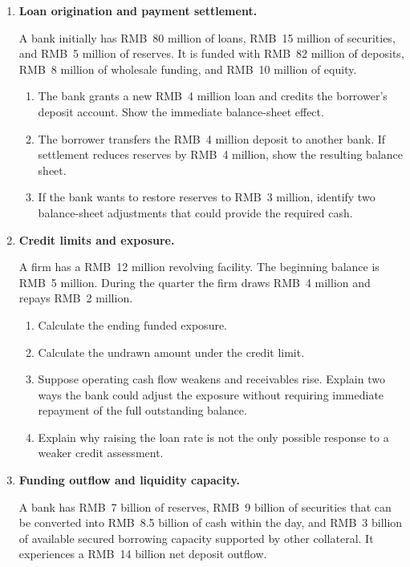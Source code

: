 \begin{enumerate}

\item \textbf{Loan origination and payment settlement.}

A bank initially has RMB~80 million of loans, RMB~15 million of securities, and RMB~5 million of reserves. It is funded with RMB~82 million of deposits, RMB~8 million of wholesale funding, and RMB~10 million of equity.

\begin{enumerate}

\item The bank grants a new RMB~4 million loan and credits the borrower's
deposit account. Show the immediate balance-sheet effect.

\item The borrower transfers the RMB~4 million deposit to another bank.
If settlement reduces reserves by RMB~4 million, show the resulting balance sheet.

\item If the bank wants to restore reserves to RMB~3 million, identify two
balance-sheet adjustments that could provide the required cash.

\end{enumerate}

\item \textbf{Credit limits and exposure.}

A firm has a RMB~12 million revolving facility. The beginning balance is RMB~5 million. During the quarter the firm draws RMB~4 million and repays RMB~2 million.

\begin{enumerate}
\item Calculate the ending funded exposure.
\item Calculate the undrawn amount under the credit limit.
\item Suppose operating cash flow weakens and receivables rise. Explain two ways the bank could adjust the exposure without requiring immediate repayment of the full outstanding balance.
\item Explain why raising the loan rate is not the only possible response to a weaker credit assessment.
\end{enumerate}

\item \textbf{Funding outflow and liquidity capacity.}

A bank has RMB~7 billion of reserves, RMB~9 billion of securities that can be converted into RMB~8.5 billion of cash within the day, and RMB~3 billion of available secured borrowing capacity supported by other collateral. It experiences a RMB~14 billion net deposit outflow.


\end{enumerate}
